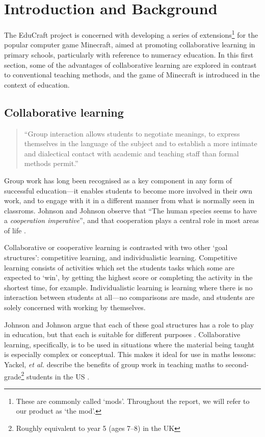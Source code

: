 \chapter{Introduction and Background}
\label{ch:introduction}
The EduCraft project is concerned with developing a series of
extensions\footnote{These are commonly called `mods'. Throughout the report,
we will refer to our product as `the mod'.} for the popular computer game
Minecraft, aimed at promoting collaborative learning in primary schools,
particularly with reference to numeracy education. In this first section, some
of the advantages of collaborative learning are explored in contrast to
conventional teaching methods, and the game of Minecraft is introduced in the
context of education.

\section{Collaborative learning}
\begin{quote}
``Group interaction allows students to negotiate meanings, to express
themselves in the language of the subject and to establish a more intimate
and dialectical contact with academic and teaching staff than formal
methods permit.'' \cite[p.~1]{jacques00}
\end{quote}
Group work has long been recognised as a key component in any form of
successful education---it enables students to become more involved in their
own work, and to engage with it in a different manner from what is normally
seen in classroms. Johnson and Johnson observe that ``The human species seems
to have a \textit{cooperation imperative}'', and that cooperation plays
a central role in most areas of life \cite[p.~12]{johnson94}.

Collaborative or cooperative learning is contrasted with two other `goal
structures': competitive learning, and individualistic learning. Competitive
learning consists of activities which set the students tasks which some
are expected to `win', by getting the highest score or completing the activity
in the shortest time, for example. Individualistic learning is learning where
there is no interaction between students at all---no comparisons are made,
and students are solely concerned with working by themselves.

Johnson and Johnson argue that each of these goal structures has a role
to play in education, but that each is suitable for different
purposes \cite{johnson94}.  Collaborative learning, specifically, is to
be used in situations where the material being taught is especially
complex or conceptual. This makes it ideal for use in maths lessons:
Yackel, \textit{et al.} describe the benefits of group work in teaching maths
to second-grade\footnote{Roughly equivalent to year 5 (ages 7--8) in the UK}
students in the US \cite{yackel91}.

